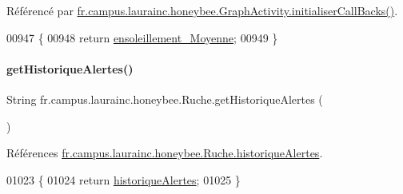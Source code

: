 Référencé par \hyperlink{classfr_1_1campus_1_1laurainc_1_1honeybee_1_1_graph_activity_a8dc56c3e0744bcb9295ad10e726b5fdb}{fr.\+campus.\+laurainc.\+honeybee.\+Graph\+Activity.\+initialiser\+Call\+Backs()}.


\begin{DoxyCode}
00947                                               \{
00948         \textcolor{keywordflow}{return} \hyperlink{classfr_1_1campus_1_1laurainc_1_1honeybee_1_1_ruche_af3da6a0f98d377ec6633f40a8c0e5c99}{ensoleillement\_Moyenne};
00949     \}
\end{DoxyCode}
\mbox{\label{classfr_1_1campus_1_1laurainc_1_1honeybee_1_1_ruche_a97cc64f6d39ee995175e389bad662b86}} 
\paragraph{\texorpdfstring{get\+Historique\+Alertes()}{getHistoriqueAlertes()}}
{\footnotesize\ttfamily String fr.\+campus.\+laurainc.\+honeybee.\+Ruche.\+get\+Historique\+Alertes (\begin{DoxyParamCaption}{ }\end{DoxyParamCaption})}



Références \hyperlink{classfr_1_1campus_1_1laurainc_1_1honeybee_1_1_ruche_a8befaea028a782bb0cec7b4934210183}{fr.\+campus.\+laurainc.\+honeybee.\+Ruche.\+historique\+Alertes}.


\begin{DoxyCode}
01023                                          \{
01024         \textcolor{keywordflow}{return} \hyperlink{classfr_1_1campus_1_1laurainc_1_1honeybee_1_1_ruche_a8befaea028a782bb0cec7b4934210183}{historiqueAlertes};
01025     \}
\end{DoxyCode}
\mbox{\label{classfr_1_1campus_1_1laurainc_1_1honeybee_1_1_ruche_a1c94b1323990dac4de2af7e9b9c192ea}} 
